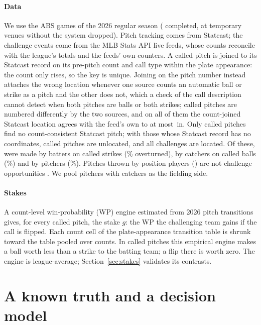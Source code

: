 \documentclass[aoas]{imsart}
\theoremstyle{plain}
\theoremstyle{definition}
\begin{document}
\paragraph{Data} We use the \NGamesABS{} ABS games of the 2026 regular season (\NGames{} completed, \NGamesNoABS{}
at temporary venues without the system dropped). Pitch tracking comes from Statcast; the challenge events come from the
MLB Stats API live feeds, whose counts reconcile with the league's totals and the feeds' own counters. A called pitch
is joined to its Statcast record on its pre-pitch count and call type within the plate appearance: the count only
rises, so the key is unique. Joining on the pitch number instead attaches the wrong
location whenever one source counts an automatic ball or strike as a pitch and the other does not, which a check of the
call description cannot detect when both pitches are balls or both strikes; \NRenumbered{} called pitches are
numbered differently by the two sources, and on all of them the count-joined Statcast location agrees with the feed's own to at most \RenumMaxDiff\,in. Only \NUnmatched{} called pitches find no count-consistent Statcast pitch; with those
whose Statcast record has no coordinates, \NNoLoc{} called pitches are unlocated, and all \NChallenges{} challenges are
located. Of these, \NChBatter{} were made by batters on called
strikes (\OverturnBatter\% overturned), \NChCatcher{} by catchers on called balls (\OverturnCatcher\%) and
\NChPitcher{} by pitchers (\OverturnPitcher\%). Pitches thrown by position players (\NPosPitch{}) are not challenge
opportunities \citep{Savant2026abs}. We pool pitchers with catchers as the fielding side.

\paragraph{Stakes} A count-level win-probability (WP) engine estimated from 2026 pitch transitions gives, for every
called pitch, the stake $g$: the WP the challenging team gains if the call is flipped. Each count cell of the
plate-appearance transition table is shrunk toward the table pooled over counts. In \NNonMono{} called pitches this
empirical engine makes a ball worth less than a strike to the batting team; a flip there is worth zero. The engine is
league-average; Section~\ref{sec:stakes} validates its contrasts.

\section{A known truth and a decision model}\label{sec:model}
\end{document}
